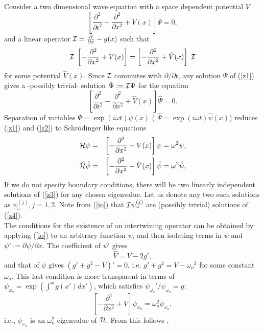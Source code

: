 \documentclass[aps,floats,showpacs,amssymb,tightenlines]{revtex4}
\def\w{\omega}
\def\p{\partial}
\def\I{{\cal I}}
\def\po{\psi_{\w_o}}
\begin{document}
Consider a two dimensional wave  equation with a space dependent potential $V$
\begin{equation} \label{z1}
\left[ \frac{\p^2 }{\p t^2} - \frac{\p^2 }{\p x^2} + V(x) \right] \Psi = 0,
\end{equation}
and a linear operator $\I= \frac{\p}{\p x} -g(x)$ such that \cite{price}
\begin{equation} \label{io}
\I \; \left[ - \frac{\p^2 }{\p x^2} + V(x) \right]  =   \left[ - \frac{\p^2 }{\p x^2} + \hat V(x) \right] \; \I
\end{equation}
for some potential $\hat V(x)$. Since $\I$  commutes with $\p /\p t$, any solution $\Psi$ of (\ref{z1})  gives a -possibly trivial- solution $\hat \Psi := \I \Psi$ for the equation
\begin{equation} \label{z2}
\left[ \frac{\p^2 }{\p t^2} - \frac{\p^2 }{\p x^2} + \hat V(x)
\right] \hat \Psi = 0.
\end{equation}
Separation of variables $\Psi = \exp(i\w t) \psi(x)$
  ( $\hat \Psi = \exp(i\w t) \hat \psi(x)$) reduces (\ref{z1})
and (\ref{z2})  to   Schr\"odinger like
equations
\begin{eqnarray} \label{z3}
{\cal H} \psi  &=& \left[ - \frac{\p^2 }{\p x^2} + V(x) \right] \psi = \w ^2 \psi ,\\
\hat {\cal H} \hat \psi &=& \left[ - \frac{\p^2 }{\p x^2} + \hat
V(x) \right] \hat \psi = \w ^2 \hat \psi , \label{z4}
\end{eqnarray}
If we do not specify boundary conditions, there will be
two linearly independent solutions of (\ref{z3}) for any chosen
eigenvalue. Let us   denote any two such solutions  as $\psi_{\w}^{(j)}, j=1,2$. Note from (\ref{io}) that
 $ \I \psi _{\w}^{(j)}$ are (possibly trivial) solutions of  (\ref{z4}).\\
The conditions for the existence of an intertwining operator can be
obtained
 by applying (\ref{io}) to an
arbitrary function $\psi$, and then isolating  terms in $\psi$ and $\psi' := \p \psi / \p x$.
The coefficient of $\psi'$ gives
\begin{equation} \label{vh}
\hat V = V - 2 g' ,
\end{equation}
and that of $\psi$ gives $(g' + g^2-V)' = 0$, i.e.
$g'+g^2=V-\w_o{}^2$ for some constant $\w_o$. This last condition is
more transparent in terms of  $\po =\exp (\int^x g(x') dx' )$, which satisfies $\po'/\po=g$:
\begin{equation} \label{zz}
\left[ - \frac{\p^2 }{\p x^2} + V \right] \po = \w_o ^2 \po,
\end{equation}
i.e.,  $\po$ is an $\w_o^2$ eigenvalue of ${\cal H}$. From this follows \cite{price},
\end{document}
